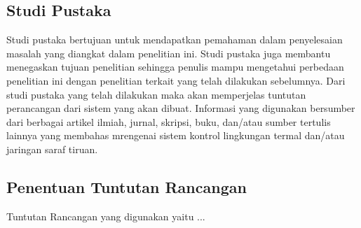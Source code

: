 

\subsection{Studi Pustaka}
Studi pustaka bertujuan untuk mendapatkan pemahaman dalam penyelesaian masalah yang diangkat dalam penelitian ini. Studi pustaka juga membantu menegaskan tujuan penelitian sehingga penulis mampu mengetahui perbedaan penelitian ini dengan penelitian terkait yang telah dilakukan sebelumnya. Dari studi pustaka yang telah dilakukan maka akan memperjelas tuntutan perancangan dari sistem yang akan dibuat. Informasi yang digunakan bersumber dari berbagai artikel ilmiah, jurnal, skripsi, buku, dan/atau sumber tertulis lainnya yang membahas mrengenai sistem kontrol lingkungan termal dan/atau jaringan saraf tiruan.

\subsection{Penentuan Tuntutan Rancangan}

Tuntutan Rancangan yang digunakan yaitu ...

